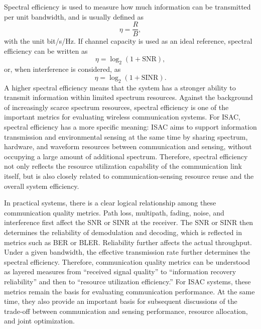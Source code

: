 Spectral efficiency is used to measure how much information can be transmitted per unit bandwidth,
and is usually defined as
\begin{equation}
    \eta
    =
    \frac{R}{B},
    \label{eq:spectral-efficiency-definition}
\end{equation}
with the unit bit/s/Hz.
If channel capacity is used as an ideal reference,
spectral efficiency can be written as
\begin{equation}
    \eta
    =
    \log_2
    \left(
        1+\mathrm{SNR}
    \right),
    \label{eq:spectral-efficiency-snr}
\end{equation}
or,
when interference is considered,
as
\begin{equation}
    \eta
    =
    \log_2
    \left(
        1+\mathrm{SINR}
    \right).
    \label{eq:spectral-efficiency-sinr}
\end{equation}
A higher spectral efficiency means that the system has a stronger ability
to transmit information within limited spectrum resources.
Against the background of increasingly scarce spectrum resources,
spectral efficiency is one of the important metrics for evaluating wireless communication systems.
For ISAC,
spectral efficiency has a more specific meaning:
ISAC aims to support information transmission and environmental sensing at the same time
by sharing spectrum,
hardware,
and waveform resources between communication and sensing,
without occupying a large amount of additional spectrum.
Therefore,
spectral efficiency not only reflects the resource utilization capability of the communication link itself,
but is also closely related to communication-sensing resource reuse
and the overall system efficiency.

In practical systems,
there is a clear logical relationship among these communication quality metrics.
Path loss,
multipath,
fading,
noise,
and interference first affect the SNR or SINR at the receiver.
The SNR or SINR then determines the reliability of demodulation and decoding,
which is reflected in metrics such as BER or BLER.
Reliability further affects the actual throughput.
Under a given bandwidth,
the effective transmission rate further determines the spectral efficiency.
Therefore,
communication quality metrics can be understood as layered measures
from ``received signal quality''
to ``information recovery reliability''
and then to ``resource utilization efficiency.''
For ISAC systems,
these metrics remain the basis for evaluating communication performance.
At the same time,
they also provide an important basis for subsequent discussions of the trade-off between communication and sensing performance,
resource allocation,
and joint optimization.


